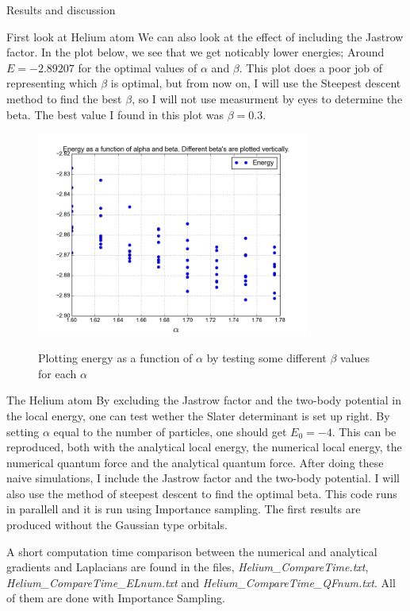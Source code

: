 \documentclass[a4paper, 12pt, titlepage]{article}
\begin{document}
\begin{section}{Results and discussion}
\begin{subsection}{First look at Helium atom}
 We can also look at the effect of including the Jastrow factor. In the plot below, we see that we get noticably lower energies; Around $E = -2.89207$ for the optimal values of $\alpha$ and $\beta$. This plot does a poor job of representing which $\beta$ is optimal, but from now on, I will use the Steepest descent method to find the best $\beta$, so I will not use measurment by eyes to determine the beta. The best value I found in this plot was $\beta = 0.3$. 
 \begin{figure}[H]
 	\centering
 	\includegraphics[width=0.8\textwidth]{../python_programs/EnergyVariance_helium5.png}
 	\label{Helium3}
 	\caption{Plotting energy as a function of $\alpha$ by testing some different $\beta$ values for each $\alpha$}
 \end{figure}

 \end{subsection}
 \begin{subsection}{The Helium atom}
 	By excluding the Jastrow factor and the two-body potential in the local energy, one can test wether the Slater determinant is set up right. By setting $\alpha$ equal to the number of particles, one should get $E_0 = -4$. This can be reproduced, both with the analytical local energy, the numerical local energy, the numerical quantum force and the analytical quantum force. After doing these naive simulations, I include the Jastrow factor and the two-body potential. I will also use the method of steepest descent to find the optimal beta. This code runs in parallell and it is run using Importance sampling. The first results are produced without the Gaussian type orbitals. 

	 A short computation time comparison between the numerical and analytical gradients and Laplacians are found in the files, \textit{Helium\_CompareTime.txt}, \textit{Helium\_CompareTime\_ELnum.txt} and \textit{Helium\_CompareTime\_QFnum.txt}. All of them are done with Importance Sampling. 


\end{subsection}
\end{section}
\end{document}
